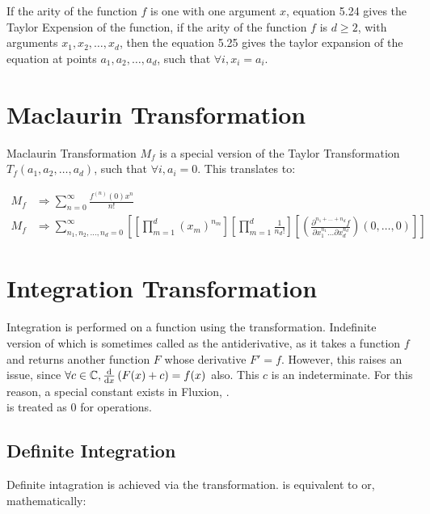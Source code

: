 \documentclass[11pt,a4paper]{book}
\begin{document}
If the arity of the function $f$ is one with one argument $x$, equation 5.24 gives the Taylor Expension of the function, if the arity of the function $f$ is $d \geq 2$, with arguments $x_1, x_2, \dots, x_d$, then the equation 5.25 gives the taylor expansion of the equation at points $a_1, a_2, \dots, a_d$, such that $\forall i, x_i = a_i$.

\section{Maclaurin Transformation}

Maclaurin Transformation $M_f$ is a special version of the Taylor Transformation $T_f(a_1, a_2, \dots, a_d)$, such that $\forall i, a_i = 0$. This translates to:

\begin{align}
M_f &\Rightarrow \sum_{n = 0}^{\infty} \frac{f^{(n)}(0)x^n}{n!} \\
M_f &\Rightarrow \sum_{n_1, n_2, \dots, n_d = 0}^{\infty} \left[ \left[ \prod_{m = 1}^d (x_m)^{n_m} \right] \left[ \prod_{m=1}^d \frac{1}{n_d!} \right] \left[\left( \frac{\partial^{n_1 + \dots + n_d} f}{\partial x_1^{n_1} \dots \partial x_d^{n_d}} \right)(0, \dots, 0) \right] \right]
\end{align}

\section{Integration Transformation}

Integration is performed on a function using the  transformation. Indefinite version of which is sometimes called as the antiderivative, as it takes a function $f$ and returns another function $F$ whose derivative $F' = f$. However, this raises an issue, since $\forall c \in \mathbb{C}, \frac{\text{d}}{\text{d}x} \left(F(x) + c\right) = f(x)$ also. This $c$ is an indeterminate. For this reason, a special constant exists in Fluxion, .\\

 is treated as 0 for operations. \\

\subsection{Definite Integration}

Definite intagration is achieved via the  transformation.  is equivalent to  or, mathematically:
\end{document}
